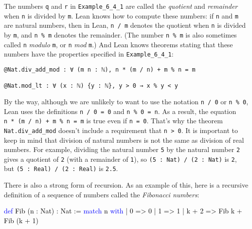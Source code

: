 \documentclass[
  letterpaper,
  DIV=11,
  numbers=noendperiod]{scrreprt}
\newenvironment{Shaded}{\begin{snugshade}}{\end{snugshade}}
\newcommand{\KeywordTok}[1]{\textcolor[rgb]{0.00,0.23,0.31}{#1}}
\newcommand{\NormalTok}[1]{\textcolor[rgb]{0.00,0.23,0.31}{#1}}
\renewcommand{\NormalTok}[1]{\textcolor[HTML]{000000}{#1}}
\renewcommand{\KeywordTok}[1]{\textcolor[HTML]{0000FF}{#1}}
\newenvironment{ind}
	{\begin{list}{}{\setlength{\leftmargin}{1em}}\item\relax}
	{\end{list}}
\theoremstyle{remark}
\begin{document}
The numbers \texttt{q} and \texttt{r} in \texttt{Example\_6\_4\_1} are
called the \emph{quotient} and \emph{remainder} when \texttt{n} is
divided by \texttt{m}. Lean knows how to compute these numbers: if
\texttt{n} and \texttt{m} are natural numbers, then in Lean,
\texttt{n\ /\ m} denotes the quotient when \texttt{n} is divided by
\texttt{m}, and \texttt{n\ \%\ m} denotes the remainder. (The number
\texttt{n\ \%\ m} is also sometimes called \texttt{n} \emph{modulo}
\texttt{m}, or \texttt{n} \emph{mod} \texttt{m}.) And Lean knows
theorems stating that these numbers have the properties specified in
\texttt{Example\_6\_4\_1}:

\begin{ind}

\begin{verbatim}
@Nat.div_add_mod : ∀ (m n : ℕ), n * (m / n) + m % n = m

@Nat.mod_lt : ∀ (x : ℕ) {y : ℕ}, y > 0 → x % y < y
\end{verbatim}

\end{ind}

By the way, although we are unlikely to want to use the notation
\texttt{n\ /\ 0} or \texttt{n\ \%\ 0}, Lean uses the definitions
\texttt{n\ /\ 0\ =\ 0} and \texttt{n\ \%\ 0\ =\ n}. As a result, the
equation \texttt{n\ *\ (m\ /\ n)\ +\ m\ \%\ n\ =\ m} is true even if
\texttt{n\ =\ 0}. That's why the theorem \texttt{Nat.div\_add\_mod}
doesn't include a requirement that \texttt{n\ \textgreater{}\ 0}. It is
important to keep in mind that division of natural numbers is not the
same as division of real numbers. For example, dividing the natural
number \texttt{5} by the natural number \texttt{2} gives a quotient of
\texttt{2} (with a remainder of \texttt{1}), so
\texttt{(5\ :\ Nat)\ /\ (2\ :\ Nat)} is \texttt{2}, but
\texttt{(5\ :\ Real)\ /\ (2\ :\ Real)} is \texttt{2.5}.

There is also a strong form of recursion. As an example of this, here is
a recursive definition of a sequence of numbers called the
\emph{Fibonacci numbers}:

\begin{Shaded}
\begin{Highlighting}[]
\KeywordTok{def}\NormalTok{ Fib (n : Nat) : Nat :=}
  \KeywordTok{match}\NormalTok{ n }\KeywordTok{with}
\NormalTok{    | 0 =\textgreater{} 0}
\NormalTok{    | 1 =\textgreater{} 1}
\NormalTok{    | k + 2 =\textgreater{} Fib k + Fib (k + 1)}
\end{Highlighting}
\end{Shaded}
\end{document}
